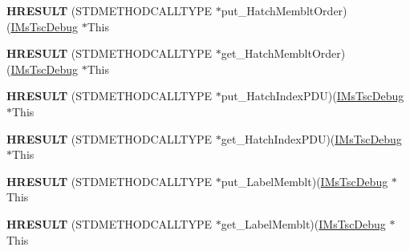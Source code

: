 \begin{DoxyCompactItemize}
\item 
\mbox{\label{struct_m_s_t_s_c_lib_1_1_i_ms_tsc_debug_vtbl_afa5cda102bc94fa204afb6bfa8590bd8}} 
{\bfseries H\+R\+E\+S\+U\+LT} (S\+T\+D\+M\+E\+T\+H\+O\+D\+C\+A\+L\+L\+T\+Y\+PE $\ast$put\+\_\+\+Hatch\+Memblt\+Order)(\hyperlink{interface_m_s_t_s_c_lib_1_1_i_ms_tsc_debug}{I\+Ms\+Tsc\+Debug} $\ast$This
\item 
\mbox{\label{struct_m_s_t_s_c_lib_1_1_i_ms_tsc_debug_vtbl_a6514cc20d002db312dc3d43fe80aff15}} 
{\bfseries H\+R\+E\+S\+U\+LT} (S\+T\+D\+M\+E\+T\+H\+O\+D\+C\+A\+L\+L\+T\+Y\+PE $\ast$get\+\_\+\+Hatch\+Memblt\+Order)(\hyperlink{interface_m_s_t_s_c_lib_1_1_i_ms_tsc_debug}{I\+Ms\+Tsc\+Debug} $\ast$This
\item 
\mbox{\label{struct_m_s_t_s_c_lib_1_1_i_ms_tsc_debug_vtbl_ab7dd09f70e286ac8deafb5137138ad09}} 
{\bfseries H\+R\+E\+S\+U\+LT} (S\+T\+D\+M\+E\+T\+H\+O\+D\+C\+A\+L\+L\+T\+Y\+PE $\ast$put\+\_\+\+Hatch\+Index\+P\+DU)(\hyperlink{interface_m_s_t_s_c_lib_1_1_i_ms_tsc_debug}{I\+Ms\+Tsc\+Debug} $\ast$This
\item 
\mbox{\label{struct_m_s_t_s_c_lib_1_1_i_ms_tsc_debug_vtbl_a760c045ddec067e19e7a55cd18bc08b1}} 
{\bfseries H\+R\+E\+S\+U\+LT} (S\+T\+D\+M\+E\+T\+H\+O\+D\+C\+A\+L\+L\+T\+Y\+PE $\ast$get\+\_\+\+Hatch\+Index\+P\+DU)(\hyperlink{interface_m_s_t_s_c_lib_1_1_i_ms_tsc_debug}{I\+Ms\+Tsc\+Debug} $\ast$This
\item 
\mbox{\label{struct_m_s_t_s_c_lib_1_1_i_ms_tsc_debug_vtbl_a97ec52c3808e33350164305166c98cb1}} 
{\bfseries H\+R\+E\+S\+U\+LT} (S\+T\+D\+M\+E\+T\+H\+O\+D\+C\+A\+L\+L\+T\+Y\+PE $\ast$put\+\_\+\+Label\+Memblt)(\hyperlink{interface_m_s_t_s_c_lib_1_1_i_ms_tsc_debug}{I\+Ms\+Tsc\+Debug} $\ast$This
\item 
\mbox{\label{struct_m_s_t_s_c_lib_1_1_i_ms_tsc_debug_vtbl_a53c12c9435712a31b669a2ab0909bdeb}} 
{\bfseries H\+R\+E\+S\+U\+LT} (S\+T\+D\+M\+E\+T\+H\+O\+D\+C\+A\+L\+L\+T\+Y\+PE $\ast$get\+\_\+\+Label\+Memblt)(\hyperlink{interface_m_s_t_s_c_lib_1_1_i_ms_tsc_debug}{I\+Ms\+Tsc\+Debug} $\ast$This

\end{DoxyCompactItemize}
